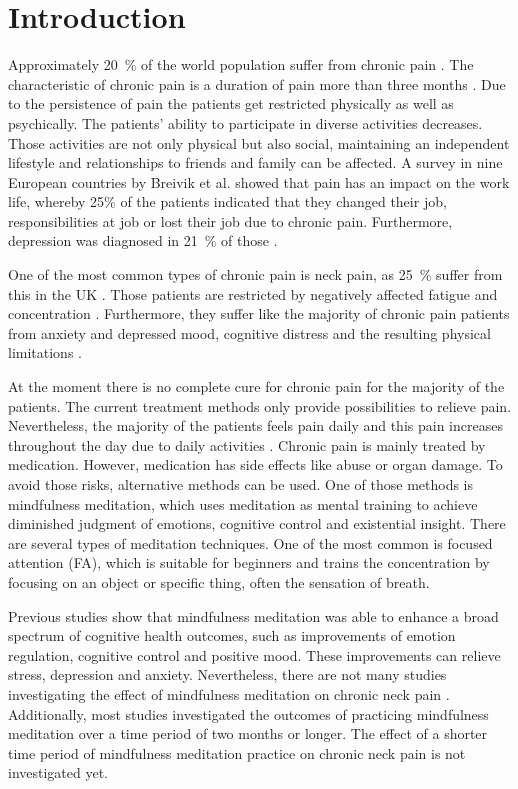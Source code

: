 \section{Introduction}
Approximately 20~\% of the world population suffer from chronic pain \cite{Macfarlanea2016}. The characteristic of chronic pain is a duration of pain more than three months \cite{Mello2016}. Due to the persistence of pain the patients get restricted physically as well as psychically. The patients’ ability to participate in diverse activities decreases. Those activities are not only physical but also social, maintaining an independent lifestyle and relationships to friends and family can be affected. A survey in nine European countries by Breivik et al. \cite{Breivik2006} showed that pain has an impact on the work life, whereby 25\% of the patients indicated that they changed their job, responsibilities at job or lost their job due to chronic pain. Furthermore, depression was diagnosed in 21~\% of those \cite{Breivik2006}.

One of the most common types of chronic pain is neck pain, as 25~\% suffer from this in the UK \cite{Macfarlanea2016}. Those patients are restricted by negatively affected fatigue and concentration \cite{vanRanderaat2016}. Furthermore, they suffer like the majority of chronic pain patients from anxiety and depressed mood, cognitive distress and the resulting physical limitations \cite{Gross2013}. 

At the moment there is no complete cure for chronic pain for the majority of the patients. The current treatment methods only provide possibilities to relieve pain. \cite{Pope2017,marcus2009} Nevertheless, the majority of the patients feels pain daily and this pain increases throughout the day due to daily activities \cite{Breivik2006}. 
Chronic pain is mainly treated by medication. However, medication has side effects like abuse or organ damage. To avoid those risks, alternative methods can be used. \cite{Pope2017,marcus2009, stein2007} One of those methods is mindfulness meditation, which uses meditation as mental training to achieve diminished judgment of emotions, cognitive control and existential insight. There are several types of meditation techniques. One of the most common is  focused attention (FA), which is suitable for beginners and trains the concentration by focusing on an object or specific thing, often the sensation of breath. \cite{Zeidan2016, Kabat1982}

Previous studies show that mindfulness meditation was able to enhance a broad spectrum of cognitive health outcomes,  such as improvements of emotion regulation, cognitive control and positive mood. These improvements can relieve stress, depression and anxiety. \cite{marcus2009, Zeidan2016, Zeidan2012}
Nevertheless, there are not many studies investigating the effect of mindfulness meditation on chronic neck pain \cite{Macfarlanea2016}. Additionally, most studies investigated the outcomes of practicing mindfulness meditation over a time period of two months or longer. The effect of a shorter time period of mindfulness meditation practice on chronic neck pain is not investigated yet. 


